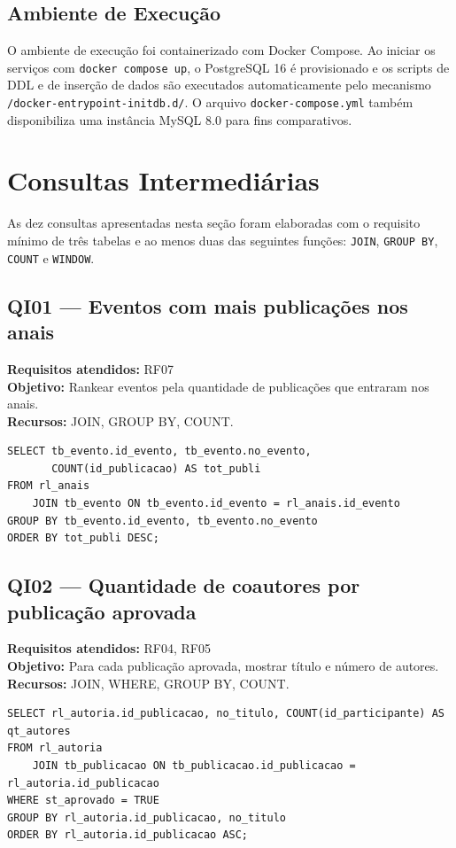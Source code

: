 \documentclass[12pt]{article}
\begin{document}
\subsection{Ambiente de Execução}
\label{subsec:docker}

O ambiente de execução foi containerizado com Docker Compose. Ao iniciar os serviços com \texttt{docker compose up}, o PostgreSQL 16 é provisionado e os scripts de DDL e de inserção de dados são executados automaticamente pelo mecanismo \texttt{/docker-entrypoint-initdb.d/}. O arquivo \texttt{docker-compose.yml} também disponibiliza uma instância MySQL 8.0 para fins comparativos.

\section{Consultas Intermediárias}
\label{sec:consultas}

As dez consultas apresentadas nesta seção foram elaboradas com o requisito mínimo de três tabelas e ao menos duas das seguintes funções: \texttt{JOIN}, \texttt{GROUP BY}, \texttt{COUNT} e \texttt{WINDOW}.

\subsection{QI01 --- Eventos com mais publicações nos anais}
\textbf{Requisitos atendidos:} RF07 \\
\textbf{Objetivo:} Rankear eventos pela quantidade de publicações que entraram nos anais.\\
\textbf{Recursos:} JOIN, GROUP BY, COUNT.
\begin{lstlisting}[caption={QI01 -- Eventos com mais publicações nos anais.}]
SELECT tb_evento.id_evento, tb_evento.no_evento,
       COUNT(id_publicacao) AS tot_publi
FROM rl_anais
    JOIN tb_evento ON tb_evento.id_evento = rl_anais.id_evento
GROUP BY tb_evento.id_evento, tb_evento.no_evento
ORDER BY tot_publi DESC;
\end{lstlisting}

\subsection{QI02 --- Quantidade de coautores por publicação aprovada}
\textbf{Requisitos atendidos:} RF04, RF05 \\
\textbf{Objetivo:} Para cada publicação aprovada, mostrar título e número de autores.\\
\textbf{Recursos:} JOIN, WHERE, GROUP BY, COUNT.
\begin{lstlisting}[caption={QI02 -- Coautores por publicação aprovada.}]
SELECT rl_autoria.id_publicacao, no_titulo, COUNT(id_participante) AS qt_autores
FROM rl_autoria
    JOIN tb_publicacao ON tb_publicacao.id_publicacao = rl_autoria.id_publicacao
WHERE st_aprovado = TRUE
GROUP BY rl_autoria.id_publicacao, no_titulo
ORDER BY rl_autoria.id_publicacao ASC;
\end{lstlisting}
\end{document}
